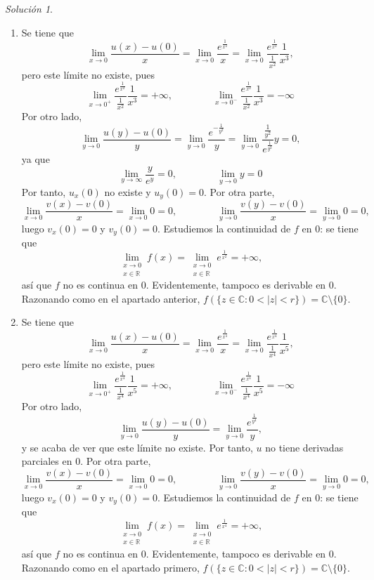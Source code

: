 \documentclass[11pt]{report}
\newcommand{\R}{\mathbb R}
\newcommand{\C}{\mathbb C}
\theoremstyle{remark}
\newtheorem*{resolution}{Solución}
\begin{document}
\begin{resolution}
\begin{enumerate}
    \item Se tiene que
    \[\lim_{x \to 0} \frac{u(x) -u(0)}{x} = \lim_{x \to 0} \frac{e^{\frac{1}{x^2}}}{x} = \lim_{x \to 0} \frac{e^{\frac{1}{x^2}}}{\frac{1}{x^2}}\frac{1}{x^3},\]
    pero este límite no existe, pues
    \[\lim_{x \to 0^+} \frac{e^{\frac{1}{x^2}}}{\frac{1}{x^2}}\frac{1}{x^3} = +\infty, \qquad \qquad \lim_{x \to 0^-} \frac{e^{\frac{1}{x^2}}}{\frac{1}{x^2}}\frac{1}{x^3} = -\infty\]
    Por otro lado,
    \[\lim_{y \to 0} \frac{u(y) -u(0)}{y} = \lim_{y \to 0} \frac{e^{-\frac{1}{y^2}}}{y} = \lim_{y \to 0} \frac{\frac{1}{y^2}}{e^{\frac{1}{y^2}}} y = 0,\]
    ya que
    \[\lim_{y \to \infty} \frac{y}{e^y} = 0, \qquad \qquad \lim_{y \to 0} y = 0\]
    Por tanto, $u_x(0)$ no existe y $u_y(0) = 0$. Por otra parte,
    \[\lim_{x \to 0} \frac{v(x)-v(0)}{x} = \lim_{x \to 0} 0 = 0, \qquad \qquad \lim_{y \to 0} \frac{v(y)-v(0)}{x} = \lim_{y \to 0} 0 = 0,\]
    luego $v_x(0) = 0$ y $v_y(0) = 0$. Estudiemos la continuidad de $f$ en 0: se tiene que
    \[\lim_{\substack{x \to 0 \\ x \in \R}} f(x) = \lim_{\substack{x \to 0 \\ x \in \R}} e^{\frac{1}{x^2}} = +\infty,\]
    así que $f$ no es continua en 0. Evidentemente, tampoco es derivable en 0. Razonando como en el apartado anterior, $f(\{z \in \C \colon 0<|z|<r\}) = \C \setminus \{0\}$.

    \item Se tiene que
    \[\lim_{x \to 0} \frac{u(x) -u(0)}{x} = \lim_{x \to 0} \frac{e^{\frac{1}{x^4}}}{x} = \lim_{x \to 0} \frac{e^{\frac{1}{x^4}}}{\frac{1}{x^4}}\frac{1}{x^5},\]
    pero este límite no existe, pues
    \[\lim_{x \to 0^+} \frac{e^{\frac{1}{x^4}}}{\frac{1}{x^4}}\frac{1}{x^5} = +\infty, \qquad \qquad \lim_{x \to 0^-} \frac{e^{\frac{1}{x^4}}}{\frac{1}{x^4}}\frac{1}{x^5} = -\infty\]
    Por otro lado,
    \[\lim_{y \to 0} \frac{u(y) -u(0)}{y} = \lim_{y \to 0} \frac{e^{\frac{1}{y^4}}}{y}, \]
    y se acaba de ver que este límite no existe. Por tanto, $u$ no tiene derivadas parciales en $0$. Por otra parte,
    \[\lim_{x \to 0} \frac{v(x)-v(0)}{x} = \lim_{x \to 0} 0 = 0, \qquad \qquad \lim_{y \to 0} \frac{v(y)-v(0)}{x} = \lim_{y \to 0} 0 = 0,\]
    luego $v_x(0) = 0$ y $v_y(0) = 0$. Estudiemos la continuidad de $f$ en 0: se tiene que
    \[\lim_{\substack{x \to 0 \\ x \in \R}} f(x) = \lim_{\substack{x \to 0 \\ x \in \R}} e^{\frac{1}{x^4}} = +\infty,\]
    así que $f$ no es continua en 0. Evidentemente, tampoco es derivable en 0. Razonando como en el apartado primero, $f(\{z \in \C \colon 0<|z|<r\}) = \C \setminus \{0\}$.
\end{enumerate}
\end{resolution}
\end{document}
